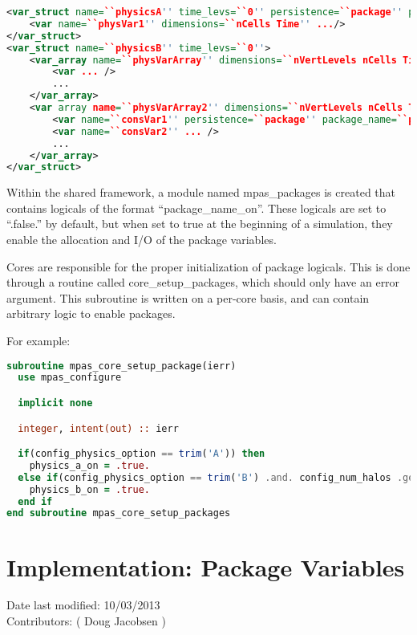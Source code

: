 \documentclass[11pt]{report}
\begin{document}
{\scriptsize
\begin{lstlisting}[language=XML]
<var_struct name=``physicsA'' time_levs=``0'' persistence=``package'' package_name=``package_a''>
	<var name=``physVar1'' dimensions=``nCells Time'' .../>
</var_struct>
<var_struct name=``physicsB'' time_levs=``0''>
	<var_array name=``physVarArray'' dimensions=``nVertLevels nCells Time'' persistence=``package'' package_name=``package_b''>
		<var ... />
		...
	</var_array>
	<var array name=``physVarArray2'' dimensions=``nVertLevels nCells Time''>
		<var name=``consVar1'' persistence=``package'' package_name=``package_b'' ... />
		<var name=``consVar2'' ... />
		...
	</var_array>
</var_struct>
\end{lstlisting}
}

Within the shared framework, a module named mpas\_packages is created that
contains logicals of the format ``package\_name\_on''. These logicals are set
to ``.false.'' by default, but when set to true at the beginning of a
simulation, they enable the allocation and I/O of the package variables. 

Cores are responsible for the proper initialization of package logicals. This
is done through a routine called core\_setup\_packages, which should only have
an error argument. This subroutine is written on a per-core basis, and can
contain arbitrary logic to enable packages.

For example:
{\scriptsize
\begin{lstlisting}[language=Fortran]
subroutine mpas_core_setup_package(ierr)
  use mpas_configure

  implicit none

  integer, intent(out) :: ierr

  if(config_physics_option == trim('A')) then
    physics_a_on = .true.
  else if(config_physics_option == trim('B') .and. config_num_halos .ge. 3) then
    physics_b_on = .true.
  end if
end subroutine mpas_core_setup_packages
\end{lstlisting}
}


\section{Implementation: Package Variables}
Date last modified: 10/03/2013 \\
Contributors: ( Doug Jacobsen ) \\
\end{document}

